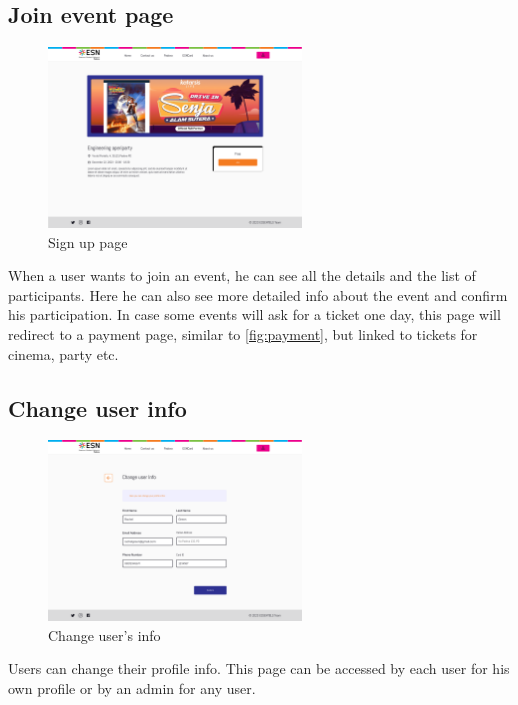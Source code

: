 \subsection{Join event page}
\begin{figure}[H]
    \centering
    \includegraphics[width=0.6\textwidth]{images/JoinEvent.png}
    \caption{Sign up page}
    \label{fig:joinEvent}
\end{figure}
When a user wants to join an event, he can see all the details and the list of participants. Here
he can also see more detailed info about the event and confirm his participation. In case some events
will ask for a ticket one day, this page will redirect to a payment page, similar to \ref{fig:payment},
but linked to tickets for cinema, party etc.
\subsection{Change user info}
\begin{figure}[H]
    \centering
    \includegraphics[width=0.6\textwidth]{images/ChangeUserDetail.png}
    \caption{Change user's info}
    \label{fig:change info}
\end{figure}
Users can change their profile info. This page can be accessed by each user for his own profile or 
by an admin for any user.